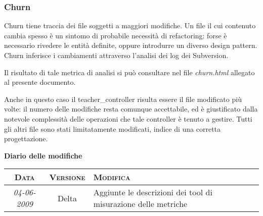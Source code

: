 \documentclass[11pt,a4paper]{article}
\newcommand{\modifiche} 
{
\newpage
\begin{center}
\textbf{Diario delle modifiche} \\
\bigskip
\begin{tabular}{|c|c|p{0.61\textwidth}|}
\hline
\textsc{Data} & \textsc{Versione} & \textsc{Modifica} \\
\hline
\hline
\textit{04-06-2009} & Delta & Aggiunte le descrizioni dei tool di misurazione delle metriche  \\
\hline
\end{tabular}
\end{center}
}
\begin{document}
\subsubsection{Churn}
Churn tiene traccia dei file soggetti a maggiori modifiche. Un file il cui contenuto cambia spesso è un sintomo di probabile necessità di refactoring: forse è necessario rivedere le entità definite, oppure introdurre un diverso design pattern.
Churn inferisce i cambiamenti attraverso l’analisi dei log dei Subversion.

Il risultato di tale metrica di analisi si può consultare nel file \textit{churn.html} allegato al presente documento.

Anche in questo caso il teacher\_controller risulta essere il file modificato più volte: il numero delle modifiche resta comunque accettabile, ed è giustificato dalla notevole complessità delle operazioni che tale controller è tenuto a gestire.
Tutti gli altri file sono stati limitatamente modificati, indice di una corretta progettazione.
\modifiche
\end{document}
